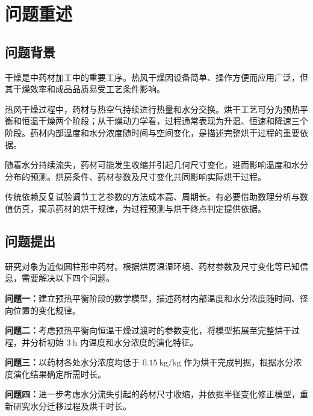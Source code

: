 \section{问题重述}

\subsection{问题背景}
干燥是中药材加工中的重要工序。热风干燥因设备简单、操作方便而应用广泛，但其干燥效率和成品品质易受工艺条件影响\cite{LiWang2024MedicinalDrying,Li2021GastrodiaDrying}。

热风干燥过程中，药材与热空气持续进行热量和水分交换。烘干工艺可分为预热平衡和恒温干燥两个阶段；从干燥动力学看，过程通常表现为升温、恒速和降速三个阶段\cite{Yan2026DryingHeatMassTransfer}。药材内部温度和水分浓度随时间与空间变化，是描述完整烘干过程的重要依据。

随着水分持续流失，药材可能发生收缩并引起几何尺寸变化，进而影响温度和水分分布的预测\cite{MayorSereno2004Shrinkage}。烘房条件、药材参数及尺寸变化共同影响实际烘干过程。

传统依赖反复试验调节工艺参数的方法成本高、周期长。有必要借助数理分析与数值仿真，揭示药材的烘干规律，为过程预测与烘干终点判定提供依据。

\subsection{问题提出}
研究对象为近似圆柱形中药材。根据烘房温湿环境、药材参数及尺寸变化等已知信息，需要解决以下四个问题。

\noindent\textbf{问题一：}建立预热平衡阶段的数学模型，描述药材内部温度和水分浓度随时间、径向位置的变化规律。

\noindent\textbf{问题二：}考虑预热平衡向恒温干燥过渡时的参数变化，将模型拓展至完整烘干过程，并分析初始 $3~\mathrm{h}$ 内温度和水分浓度的演化特征。

\noindent\textbf{问题三：}以药材各处水分浓度均低于 $0.15~\mathrm{kg/kg}$ 作为烘干完成判据，根据水分浓度演化结果确定所需时长。

\noindent\textbf{问题四：}进一步考虑水分流失引起的药材尺寸收缩，并依据半径变化修正模型，重新研究水分迁移过程及烘干时长。
